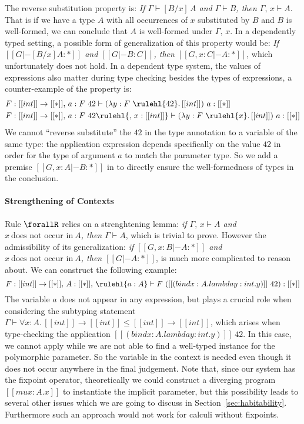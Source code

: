The reverse substitution property is:
\emph{If $\Gamma \vdash [B / x] \, A$ and $\Gamma \vdash B$, then $\Gamma,\, x \vdash A$}.
That is if we have a type $A$ with all occurrences of $x$ substituted by $B$ and $B$
is well-formed, we can conclude that $A$ is well-formed under $\Gamma,\, x$.
In a dependently typed setting, a possible form of generalization of this property
would be:
\emph{If $[[G |- [B / x] A : *]]$ and $[[G |- B : C]]$, then $[[G , x : C |- A : *]]$},
which unfortunately does not hold.
In a dependent type system, the values of expressions also matter during type checking
besides the types of expressions, a counter-example of the property is:
\begin{align*}
& F : [[int]] \rightarrow [[*]],\, a : F~42  \vdash (\lambda y : F~\rulehl{42}.\, [[int]]) ~ a : [[*]] \\
& F : [[int]] \rightarrow [[*]],\, a : F~42  \rulehl{,\, x : [[int]]} \vdash (\lambda y : F~\rulehl{x}.\, [[int]]) ~ a : [[*]]
\end{align*}
We cannot ``reverse substitute'' the $42$ in the type annotation to a variable
of the same type: the application expression depends specifically on the value
$42$ in order for the type of argument $a$ to match the parameter type.
So we add a premise $[[G , x : A |- B : *]]$ in  to directly
ensure the well-formedness of types in the conclusion.

\paragraph*{Strengthening of Contexts}
\label{sec:strengthening}

Rule $\forallR$ relies on a strenghtening lemma:
\emph{if $\Gamma,\, x \vdash A$ and $x ~\text{does not occur in}~ A$, then $\Gamma \vdash A$}, which
is trivial to prove.
However the admissibility of its generalization:
\emph{if $[[G, x : B |- A : *]]$ and $x ~\text{does not occur in}~ A$, then $[[G |- A : *]]$},
is much more complicated to reason about. We can construct the following example:
\begin{equation*}
    F : [[int]] \rightarrow [[*]],\, A : [[*]],\, \rulehl{a : A} \vdash F ~ ([[(bind x : A. lambda y : int. y)]]~ 42) : [[*]]
\end{equation*}
The variable $a$ does not appear in any expression, but plays a
crucial role when considering the subtyping statement
$\Gamma \vdash \forall x : A.\, [[int]] \rightarrow [[int]] \le [[int]] \rightarrow [[int]]$,
which arises when type-checking the application $[[(bind x : A. lambda y : int. y)]]~42$.
In this case, we cannot apply  while we are not able to find a
well-typed instance for the polymorphic parameter. So the variable in the context
is needed even though it does not occur anywhere in the final judgement.
Note that, since our system has the fixpoint operator, theoretically we could construct
a diverging program $[[mu x : A. x]]$ to instantiate the implicit parameter, but
this possibility leads to several other issues which we are going to discuss in
Section~\ref{sec:habitability}. Furthermore such an approach would not work for calculi
without fixpoints. 

